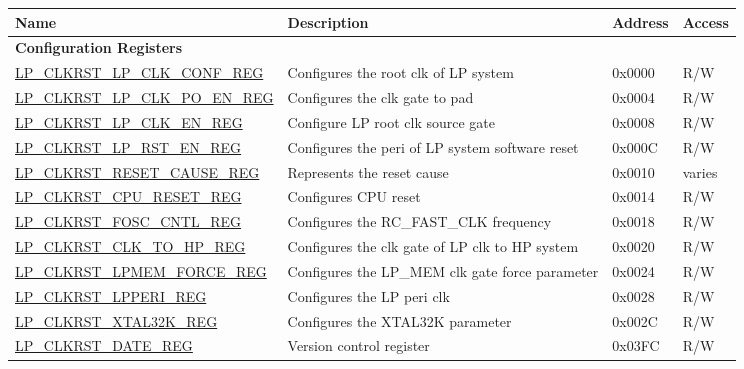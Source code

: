 \begin{longtable}{ | p{6cm} | p{7.2cm} | p{1.3cm} | p{1cm} | }
\hline\rowcolor{lightgray}
\textbf{Name} & \textbf{Description} &  \textbf{Address} & \textbf{Access} \\ \hline
\endhead
\multicolumn{4}{|l|}{\textbf{Configuration Registers}} \\ \hline
\hyperref[regdesc:LPCLKRSTLPCLKCONFREG]{LP\_CLKRST\_LP\_CLK\_CONF\_REG} & Configures the root clk of LP system & 0x0000 & R/W \\ \hline
\hyperref[regdesc:LPCLKRSTLPCLKPOENREG]{LP\_CLKRST\_LP\_CLK\_PO\_EN\_REG} & Configures the clk gate to pad & 0x0004 & R/W \\ \hline
\hyperref[regdesc:LPCLKRSTLPCLKENREG]{LP\_CLKRST\_LP\_CLK\_EN\_REG} & Configure LP root clk source gate & 0x0008 & R/W \\ \hline
\hyperref[regdesc:LPCLKRSTLPRSTENREG]{LP\_CLKRST\_LP\_RST\_EN\_REG} & Configures the peri of LP system software reset & 0x000C & R/W \\ \hline
\hyperref[regdesc:LPCLKRSTRESETCAUSEREG]{LP\_CLKRST\_RESET\_CAUSE\_REG} & Represents the reset cause & 0x0010 & varies \\ \hline
\hyperref[regdesc:LPCLKRSTCPURESETREG]{LP\_CLKRST\_CPU\_RESET\_REG} & Configures CPU reset & 0x0014 & R/W \\ \hline
\hyperref[regdesc:LPCLKRSTFOSCCNTLREG]{LP\_CLKRST\_FOSC\_CNTL\_REG} & Configures the RC\_FAST\_CLK frequency & 0x0018 & R/W \\ \hline
\hyperref[regdesc:LPCLKRSTCLKTOHPREG]{LP\_CLKRST\_CLK\_TO\_HP\_REG} & Configures the clk gate of LP clk to HP system & 0x0020 & R/W \\ \hline
\hyperref[regdesc:LPCLKRSTLPMEMFORCEREG]{LP\_CLKRST\_LPMEM\_FORCE\_REG} & Configures the LP\_MEM clk gate force parameter & 0x0024 & R/W \\ \hline
\hyperref[regdesc:LPCLKRSTLPPERIREG]{LP\_CLKRST\_LPPERI\_REG} & Configures the LP peri clk & 0x0028 & R/W \\ \hline
\hyperref[regdesc:LPCLKRSTXTAL32KREG]{LP\_CLKRST\_XTAL32K\_REG} & Configures the XTAL32K parameter & 0x002C & R/W \\ \hline
\hyperref[regdesc:LPCLKRSTDATEREG]{LP\_CLKRST\_DATE\_REG} & Version control register & 0x03FC & R/W \\ \hline

\end{longtable}
